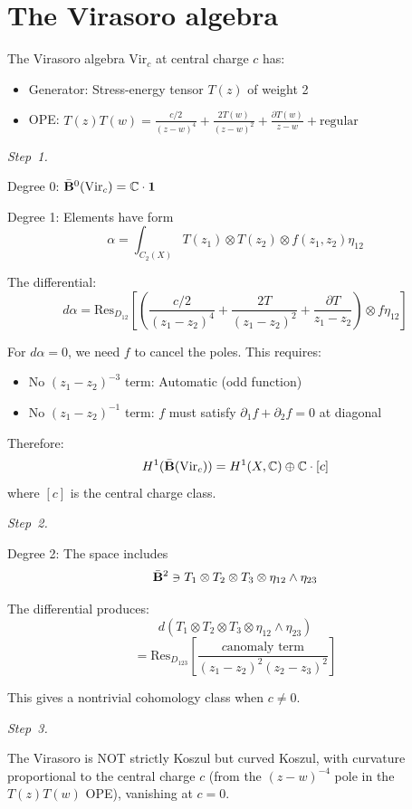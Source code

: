 \section{The Virasoro algebra}

\begin{example}
The Virasoro algebra $\text{Vir}_c$ at central charge $c$ has:
\begin{itemize}
\item Generator: Stress-energy tensor $T(z)$ of weight 2
\item OPE: $T(z)T(w) = \frac{c/2}{(z-w)^4} + \frac{2T(w)}{(z-w)^2} + \frac{\partial T(w)}{z-w} + \text{regular}$
\end{itemize}

\emph{Step~1.}

Degree 0: $\bar{\mathbf{B}}^0(\text{Vir}_c) = \mathbb{C} \cdot \mathbf{1}$

Degree 1: Elements have form
\[\alpha = \int_{C_2(X)} T(z_1) \otimes T(z_2) \otimes f(z_1, z_2)\eta_{12}\]

The differential:
\[d\alpha = \text{Res}_{D_{12}}\left[\left(\frac{c/2}{(z_1-z_2)^4} + \frac{2T}{(z_1-z_2)^2} + \frac{\partial T}{z_1-z_2}\right) \otimes f\eta_{12}\right]\]

For $d\alpha = 0$, we need $f$ to cancel the poles. This requires:
\begin{itemize}
\item No $(z_1-z_2)^{-3}$ term: Automatic (odd function)
\item No $(z_1-z_2)^{-1}$ term: $f$ must satisfy $\partial_1 f + \partial_2 f = 0$ at diagonal
\end{itemize}

Therefore:
\[H^1(\bar{\mathbf{B}}(\text{Vir}_c)) = H^1(X, \mathbb{C}) \oplus \mathbb{C} \cdot [c]\]
where $[c]$ is the central charge class.

\emph{Step~2.}

Degree 2: The space includes
\[\bar{\mathbf{B}}^2 \ni T_1 \otimes T_2 \otimes T_3 \otimes \eta_{12} \wedge \eta_{23}\]

The differential produces:
\[d(T_1 \otimes T_2 \otimes T_3 \otimes \eta_{12} \wedge \eta_{23})\]
\[= \text{Res}_{D_{123}}\left[\frac{c \text{anomaly term}}{(z_1-z_2)^2(z_2-z_3)^2}\right]\]

This gives a nontrivial cohomology class when $c \neq 0$.

\emph{Step~3.}

The Virasoro is NOT strictly Koszul but curved Koszul, with curvature proportional to the central charge $c$ (from the $(z-w)^{-4}$ pole in the $T(z)T(w)$ OPE), vanishing at $c = 0$.


\end{example}
